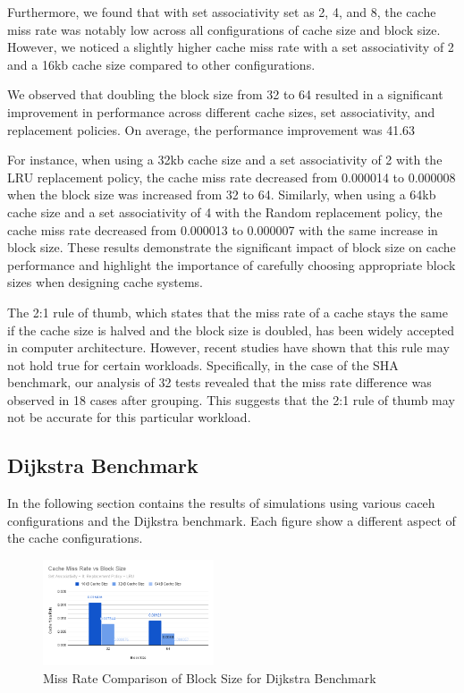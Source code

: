 \documentclass[conference]{IEEEtran}
\begin{document}
Furthermore, we found that with set associativity set as 2, 4, and 8, the cache miss rate was notably low across all configurations of cache size and block size. However, we noticed a slightly higher cache miss rate with a set associativity of 2 and a 16kb cache size compared to other configurations.

We observed that doubling the block size from 32 to 64 resulted in a significant improvement in performance across different cache sizes, set associativity, and replacement policies. On average, the performance improvement was 41.63%

For instance, when using a 32kb cache size and a set associativity of 2 with the LRU replacement policy, the cache miss rate decreased from 0.000014 to 0.000008 when the block size was increased from 32 to 64. Similarly, when using a 64kb cache size and a set associativity of 4 with the Random replacement policy, the cache miss rate decreased from 0.000013 to 0.000007 with the same increase in block size. These results demonstrate the significant impact of block size on cache performance and highlight the importance of carefully choosing appropriate block sizes when designing cache systems.

The 2:1 rule of thumb, which states that the miss rate of a cache stays the same if the cache size is halved and the block size is doubled, has been widely accepted in computer architecture. However, recent studies have shown that this rule may not hold true for certain workloads. Specifically, in the case of the SHA benchmark, our analysis of 32 tests revealed that the miss rate difference was observed in 18 cases after grouping. This suggests that the 2:1 rule of thumb may not be accurate for this particular workload.


\subsection{Dijkstra Benchmark}

In the following section contains the results of simulations using various caceh configurations and the Dijkstra benchmark. Each figure show a different aspect of the cache configurations.

\begin{figure}[H]
  \centering
  \includegraphics[width=0.45\textwidth]{dijkstraFigures/CacheMissRatevsBlockSize.png}
  \caption{Miss Rate Comparison of Block Size for Dijkstra Benchmark}
  \label{fig:MissRateVsBlockSize}
\end{figure}
\end{document}

